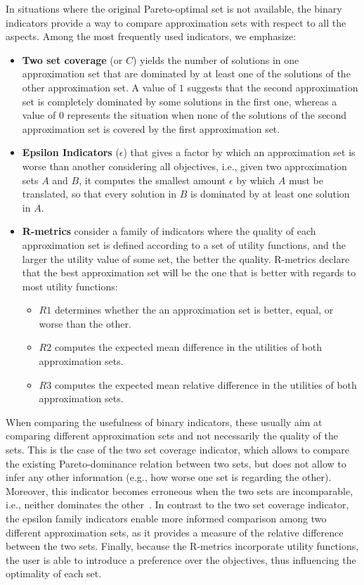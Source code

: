 In situations where the original Pareto-optimal set is not available, the binary indicators provide a way to compare approximation sets with respect to all the aspects. Among the most frequently used indicators, we emphasize:
\begin{itemize}
\item \textbf{Two set coverage} (or $C$) yields the number of solutions in one approximation set that are dominated by at least one of the solutions of the other approximation set. A value of $1$ suggests that the second approximation set is completely dominated by some solutions in the first one, whereas a value of $0$ represents the situation when none of the solutions of the second approximation set is covered by the first approximation set.

\item \textbf{Epsilon Indicators} ($\epsilon$) that gives a factor by which an approximation set is worse than another considering all objectives, i.e., given two approximation sets $A$ and $B$, it computes the smallest amount $\epsilon$ by which $A$ must be translated, so that every solution in $B$ is dominated by at least one solution in $A$.
 
\item \textbf{R-metrics} consider a family of indicators where the quality of each approximation set is defined according to a set of utility functions, and the larger the utility value of some set, the better the quality. R-metrics declare that the best approximation set will be the one that is better with regards to most utility functions:
	\begin{itemize}
	\item \textbf{$R1$} determines whether the an approximation set is better, equal, or worse than the other. 
	\item \textbf{$R2$} computes the expected mean difference in the utilities of both approximation sets.
	\item \textbf{$R3$} computes the expected mean relative difference in the utilities of both approximation sets.
	\end{itemize}
\end{itemize}

When comparing the usefulness of binary indicators, these usually aim at comparing different approximation sets and not necessarily the quality of the sets. This is the case of the two set coverage indicator, which allows to compare the existing Pareto-dominance relation between two sets, but does not allow to infer any other information (e.g., how worse one set is regarding the other). Moreover, this indicator becomes erroneous when the two sets are incomparable, i.e., neither dominates the other~\cite{Zitzler2003Metrics}. In contrast to the two set coverage indicator, the epsilon family indicators enable more informed comparison among two different approximation sets, as it provides a measure of the relative difference between the two sets. Finally, because the R-metrics incorporate utility functions, the user is able to introduce a preference over the objectives, thus influencing the optimality of each set. 

